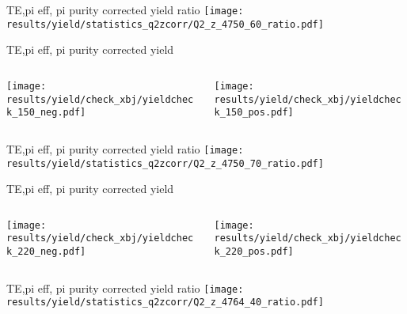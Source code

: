 \begin{frame}{TE,pi eff, pi purity corrected yield ratio}
\texttt{[image: results/yield/statistics\_q2zcorr/Q2\_z\_4750\_60\_ratio.pdf]}
\end{frame}
\begin{frame}{TE,pi eff, pi purity corrected yield}
\begin{columns}
\begin{column}[T]{0.5\textwidth}
\texttt{[image: results/yield/check\_xbj/yieldcheck\_150\_neg.pdf]}
\end{column}
\begin{column}[T]{0.5\textwidth}
\texttt{[image: results/yield/check\_xbj/yieldcheck\_150\_pos.pdf]}
\end{column}
\end{columns}
\end{frame}
\begin{frame}{TE,pi eff, pi purity corrected yield ratio}
\texttt{[image: results/yield/statistics\_q2zcorr/Q2\_z\_4750\_70\_ratio.pdf]}
\end{frame}
\begin{frame}{TE,pi eff, pi purity corrected yield}
\begin{columns}
\begin{column}[T]{0.5\textwidth}
\texttt{[image: results/yield/check\_xbj/yieldcheck\_220\_neg.pdf]}
\end{column}
\begin{column}[T]{0.5\textwidth}
\texttt{[image: results/yield/check\_xbj/yieldcheck\_220\_pos.pdf]}
\end{column}
\end{columns}
\end{frame}
\begin{frame}{TE,pi eff, pi purity corrected yield ratio}
\texttt{[image: results/yield/statistics\_q2zcorr/Q2\_z\_4764\_40\_ratio.pdf]}
\end{frame}
